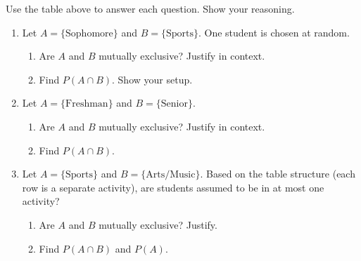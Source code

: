\documentclass[10pt]{article}
\begin{document}
\begin{tcolorbox}[colback=sky, colframe=navy, boxrule=0.9pt, arc=2mm,
    left=3mm, right=3mm, top=2mm, bottom=2mm,
    title={\bfseries\small Tier A --- Approaching Proficiency: Classify, Justify, and Compute},
    fonttitle=\small]
\small
Use the table above to answer each question. Show your reasoning.

\vspace{6pt}
\begin{enumerate}[leftmargin=1.5em, itemsep=10pt]
  \item Let $A = \{\text{Sophomore}\}$ and $B = \{\text{Sports}\}$. One student is chosen
        at random.
        \begin{enumerate}[label=(\alph*), itemsep=5pt]
          \item Are $A$ and $B$ mutually exclusive? Justify in context.\\
                \writeline\writeline
          \item Find $P(A \cap B)$. Show your setup. \blank{5cm}
        \end{enumerate}

  \item Let $A = \{\text{Freshman}\}$ and $B = \{\text{Senior}\}$.
        \begin{enumerate}[label=(\alph*), itemsep=5pt]
          \item Are $A$ and $B$ mutually exclusive? Justify in context.\\
                \writeline\writeline
          \item Find $P(A \cap B)$. \blank{4cm}
        \end{enumerate}

  \item Let $A = \{\text{Sports}\}$ and $B = \{\text{Arts/Music}\}$.
        Based on the table structure (each row is a separate activity), are students
        assumed to be in at most one activity?
        \begin{enumerate}[label=(\alph*), itemsep=5pt]
          \item Are $A$ and $B$ mutually exclusive? Justify.\\
                \writeline\writeline
          \item Find $P(A \cap B)$ and $P(A)$. \blank{5cm}
        \end{enumerate}
\end{enumerate}
\end{tcolorbox}
\end{document}
